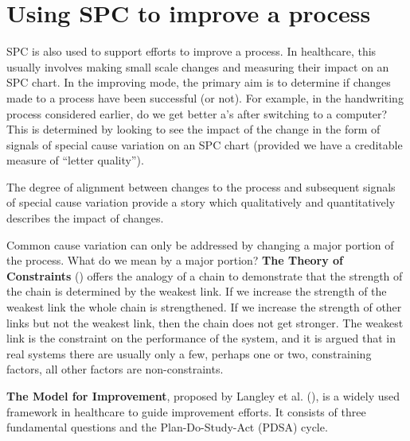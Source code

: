 \documentclass[
]{book}
\begin{document}
\section{Using SPC to improve a process}\label{using-spc-to-improve-a-process}

SPC is also used to support efforts to improve a process. In healthcare, this usually involves making small scale changes and measuring their impact on an SPC chart. In the improving mode, the primary aim is to determine if changes made to a process have been successful (or not). For example, in the handwriting process considered earlier, do we get better a's after switching to a computer? This is determined by looking to see the impact of the change in the form of signals of special cause variation on an SPC chart (provided we have a creditable measure of ``letter quality'').

The degree of alignment between changes to the process and subsequent signals of special cause variation provide a story which qualitatively and quantitatively describes the impact of changes.

Common cause variation can only be addressed by changing a major portion of the process. What do we mean by a major portion? \textbf{The Theory of Constraints} () offers the analogy of a chain to demonstrate that the strength of the chain is determined by the weakest link. If we increase the strength of the weakest link the whole chain is strengthened. If we increase the strength of other links but not the weakest link, then the chain does not get stronger. The weakest link is the constraint on the performance of the system, and it is argued that in real systems there are usually only a few, perhaps one or two, constraining factors, all other factors are non-constraints.

\textbf{The Model for Improvement}, proposed by Langley et al. (), is a widely used framework in healthcare to guide improvement efforts. It consists of three fundamental questions and the Plan-Do-Study-Act (PDSA) cycle.
\end{document}
